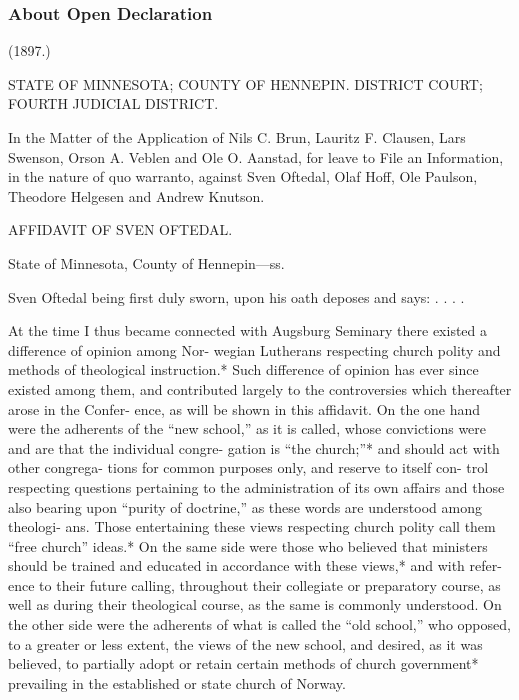 
\subsubsection{About Open Declaration}
(1897.)

STATE OF MINNESOTA; COUNTY OF HENNEPIN.
DISTRICT COURT; FOURTH JUDICIAL DISTRICT.

In the Matter of the Application of Nils C. Brun, Lauritz
F. Clausen, Lars Swenson, Orson A. Veblen and Ole
O. Aanstad, for leave to File an Information, in the
nature of quo warranto, against Sven Oftedal, Olaf
Hoff, Ole Paulson, Theodore Helgesen and Andrew
Knutson.

AFFIDAVIT OF SVEN OFTEDAL.

State of Minnesota, County of Hennepin—ss.

Sven Oftedal being first duly sworn, upon his oath
deposes and says: . . . .

At the time I thus became connected with Augsburg
Seminary there existed a difference of opinion among Nor-
wegian Lutherans respecting church polity and methods
of theological instruction.* Such difference of opinion has
ever since existed among them, and contributed largely
to the controversies which thereafter arose in the Confer-
ence, as will be shown in this affidavit. On the one hand
were the adherents of the “new school,” as it is called,
whose convictions were and are that the individual congre-
gation is “the church;”* and should act with other congrega-
tions for common purposes only, and reserve to itself con-
trol respecting questions pertaining to the administration
of its own affairs and those also bearing upon “purity of
doctrine,” as these words are understood among theologi-
ans. Those entertaining these views respecting church
polity call them “free church” ideas.* On the same side were
those who believed that ministers should be trained and
educated in accordance with these views,* and with refer-
ence to their future calling, throughout their collegiate or
preparatory course, as well as during their theological
course, as the same is commonly understood. On the other
side were the adherents of what is called the “old school,”
who opposed, to a greater or less extent, the views of the
new school, and desired, as it was believed, to partially
adopt or retain certain methods of church government*
prevailing in the established or state church of Norway.

